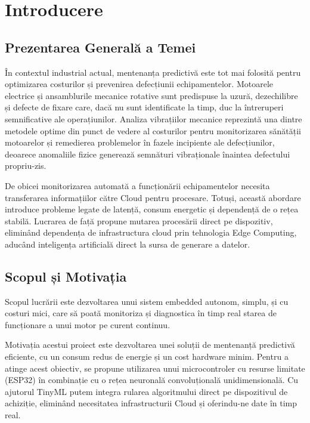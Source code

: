 \chapter{Introducere}

\section{Prezentarea Generală a Temei}
	În contextul industrial actual, mentenanța predictivă este tot mai folosită pentru optimizarea costurilor și prevenirea defecțiunii echipamentelor. Motoarele electrice și ansamblurile mecanice rotative sunt predispuse la uzură, dezechilibre și defecte de fixare care, dacă nu sunt identificate la timp, duc la întreruperi semnificative ale operațiunilor. Analiza vibrațiilor mecanice reprezintă una dintre metodele optime din punct de vedere al costurilor pentru monitorizarea sănătății motoarelor și remedierea problemelor în fazele incipiente ale defecțiunilor, deoarece anomaliile fizice generează semnături vibraționale înaintea defectului propriu-zis. \cite{gupta2025embedded, kolok2025low}
	
	De obicei monitorizarea automată a funcționării echipamentelor necesita transferarea informațiilor către Cloud pentru procesare. Totuși, această abordare introduce probleme legate de latență, consum energetic și dependență de o rețea stabilă. \cite{bala2024artificial, alfarag3embedded} Lucrarea de față propune mutarea procesării direct pe dispozitiv, eliminând dependența de infrastructura cloud prin tehnologia Edge Computing, aducând inteligența artificială direct la sursa de generare a datelor. \cite{bitam2025artificial}

\section{Scopul și Motivația}
	Scopul lucrării este dezvoltarea unui sistem embedded autonom, simplu, și cu costuri mici, care să poată monitoriza și diagnostica în timp real starea de funcționare a unui motor pe curent continuu.
	
	Motivația acestui proiect este dezvoltarea unei soluții de mentenanță predictivă eficiente, cu un consum redus de energie și un cost hardware minim. Pentru a atinge acest obiectiv, se propune utilizarea unui microcontroler cu resurse limitate (ESP32) \cite{esp32_datasheet} în combinație cu o rețea neuronală convoluțională unidimensională. \cite{kiranyaz20191} Cu ajutorul TinyML putem integra rularea algoritmului direct pe dispozitivul de achiziție, eliminând necesitatea infrastructurii Cloud și oferindu-ne date în timp real. \cite{gupta2025embedded}


